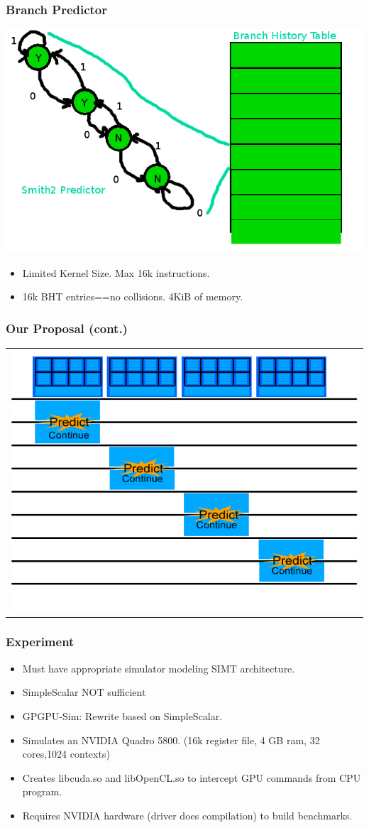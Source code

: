 \documentclass{beamer}
\begin{document}
\begin{frame}
    \frametitle{Branch Predictor}
    \includegraphics[height=.6\textheight]{bht.png}
    \begin{itemize}
     \item Limited Kernel Size.  Max 16k instructions.
     \item 16k BHT entries==no collisions.  4KiB of memory.
    \end{itemize}
\end{frame}


\begin{frame}
	\frametitle{Our Proposal (cont.)}
	\begin{tabular}{c}
		\includegraphics[width=.75\textwidth]{GPU-predict-context.jpg}
	\end{tabular}
\end{frame}

\begin{frame}
   \frametitle{Experiment}
   \begin{itemize}
    \item Must have appropriate simulator modeling SIMT architecture.
    \item SimpleScalar NOT sufficient
    \item GPGPU-Sim: Rewrite based on SimpleScalar.
    \item Simulates an NVIDIA Quadro 5800. (16k register file, 4 GB ram, 32 cores,1024 contexts)
    \item Creates libcuda.so and libOpenCL.so to intercept GPU commands from CPU program.
    \item Requires NVIDIA hardware (driver does compilation) to build benchmarks.
   \end{itemize}
\end{frame}
\end{document}
